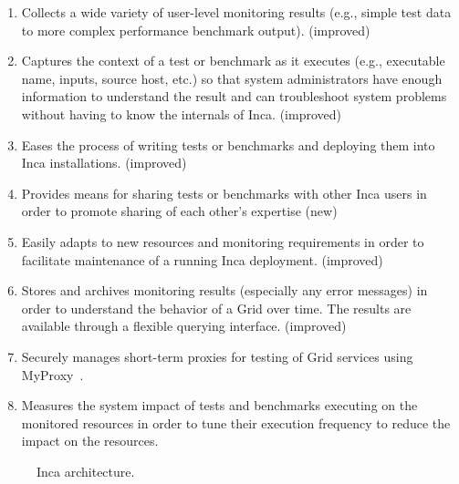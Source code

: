 \documentclass[times,10pt,twocolumn]{article}
\begin{document}
\begin{enumerate}

\item Collects a wide variety of user-level monitoring results (e.g., simple
test data to more complex performance benchmark output).  (improved) 

\item Captures the context of a test or benchmark as it executes (e.g.,
executable name, inputs, source host, etc.) so that system administrators have
enough information to understand the result and can troubleshoot system
problems without having to know the internals of Inca. (improved)

\item Eases the process of writing tests or benchmarks and deploying them into
Inca installations. (improved)

\item Provides means for sharing tests or benchmarks with other Inca 
users in order to promote sharing of each other's expertise (new)

\item Easily adapts to new resources and monitoring requirements in order to
facilitate maintenance of a running Inca deployment. (improved)

\item Stores and archives monitoring results (especially any error messages) 
in order to understand the behavior of a Grid over time. The results
are available through a flexible querying interface. (improved)

\item Securely manages short-term proxies for testing of Grid services using
MyProxy~\cite{myproxy}.

\item Measures the system impact of tests and benchmarks executing on
the monitored resources in order to tune their execution frequency to
reduce the impact on the resources.

\end{enumerate}


\begin{figure}[htb]
  \centering
  \mbox{}
  \caption{\label{arch_fig} Inca architecture.}
\end{figure}
\end{document}
